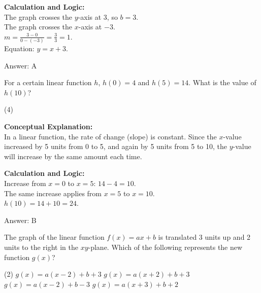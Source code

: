 \documentclass[11pt,paper=a4,answers]{exam}
\begin{document}
\begin{questions}
\begin{solution}
\vspace{10pt}
\textbf{Calculation and Logic:} \\
The graph crosses the $y$-axis at $3$, so $b = 3$. \\
The graph crosses the $x$-axis at $-3$. \\
$m = \frac{3 - 0}{0 - (-3)} = \frac{3}{3} = 1$. \\
Equation: $y = x + 3$.

\vspace{15pt}
Answer: \colorbox{yellow!100}{A}
\end{solution}

\vspace{20pt}

\question
For a certain linear function $h$, $h(0) = 4$ and $h(5) = 14$. What is the value of $h(10)$?
\begin{tasks}(4)
\end{tasks}

\begin{solution}
\textbf{Conceptual Explanation:} \\
In a linear function, the rate of change (slope) is constant. Since the $x$-value increased by 5 units from 0 to 5, and again by 5 units from 5 to 10, the $y$-value will increase by the same amount each time.

\vspace{10pt}
\textbf{Calculation and Logic:} \\
Increase from $x=0$ to $x=5$: $14 - 4 = 10$. \\
The same increase applies from $x=5$ to $x=10$. \\
$h(10) = 14 + 10 = 24$.

\vspace{15pt}
Answer: \colorbox{yellow!100}{B}
\end{solution}

\vspace{20pt}

\question
The graph of the linear function $f(x) = ax + b$ is translated 3 units up and 2 units to the right in the $xy$-plane. Which of the following represents the new function $g(x)$?
\begin{tasks}(2)
    \task $g(x) = a(x - 2) + b + 3$
    \task $g(x) = a(x + 2) + b + 3$
    \task $g(x) = a(x - 2) + b - 3$
    \task $g(x) = a(x + 3) + b + 2$
\end{tasks}


\end{questions}
\end{document}
